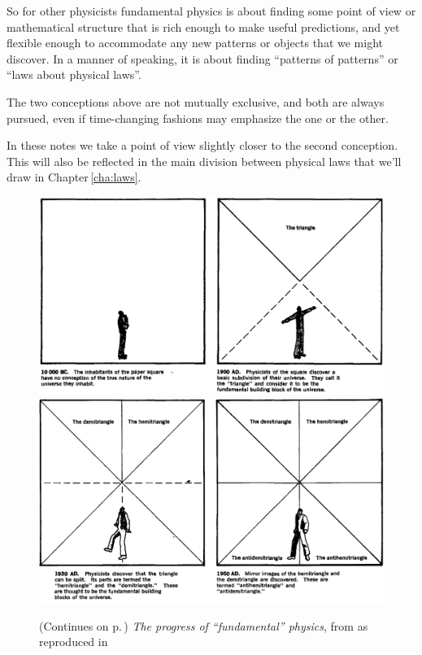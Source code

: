 \documentclass[a4paper,12pt,%
onecolumn,oneside,%
british%
]{memoir}
\renewcommand*{\|}[1][]{\nonscript\:#1\vert\nonscript\:\mathopen{}}
\newcommand*{\chap}{Chapter}%
\begin{document}
So for other physicists fundamental physics is about finding some point of view or mathematical structure that is rich enough to make useful predictions, and yet flexible enough to accommodate any new patterns or objects that we might discover. In a manner of speaking, it is about finding \enquote{patterns of patterns} or \enquote{laws about physical laws}.

The two conceptions above are not mutually exclusive, and both are always pursued, even if time-changing fashions may emphasize the one or the other.

In these notes we take a point of view slightly closer to the second conception. This will also be reflected in the main division between physical laws that we'll draw in \chap\,\ref{cha:laws}.


\begin{figure}[p]
  \centering
  \includegraphics[width=1.2\textwidth]{images/chew1.png}
  \\[1em]  \includegraphics[width=1.2\textwidth]{images/chew2.png}
  \caption{(Continues on p.\,\pageref{fig:chew2}) \emph{The progress of \enquote{fundamental} physics}, from \cites{chew1970} as reproduced in \cites{truesdell1984_r1987}}
  \label{fig:chew1}
\end{figure}
\end{document}
